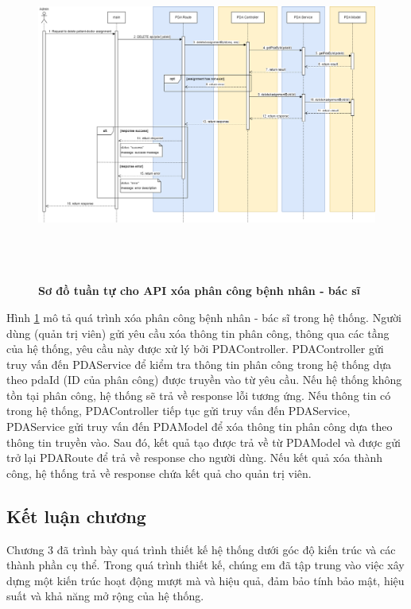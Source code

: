\begin{figure}[H]
  \centering
  \includegraphics[width=16cm,height=11cm]{Images/sequence_api/deleteAssignment.png}
  \caption[Sơ đồ tuần tự cho API xóa phân công bệnh nhân - bác sĩ]{\bfseries \fontsize{12pt}{0pt}
  \selectfont Sơ đồ tuần tự cho API xóa phân công bệnh nhân - bác sĩ }
  \label{deletePDA} %
\end{figure}
Hình \ref{deletePDA} mô tả quá trình xóa phân công bệnh nhân - bác sĩ trong hệ thống. Người dùng (quản trị viên) gửi yêu cầu xóa thông tin phân công, thông qua các tầng của hệ thống, 
yêu cầu này được xử lý bởi PDAController. PDAController gửi truy vấn đến PDAService để kiểm tra thông tin phân công trong hệ thống dựa theo pdaId (ID của phân công) được truyền vào từ yêu cầu. 
Nếu hệ thống không tồn tại phân công, hệ thống sẽ trả về response lỗi tương ứng. Nếu thông tin có trong hệ thống, PDAController tiếp tục gửi truy vấn đến PDAService, PDAService gửi truy vấn đến PDAModel để xóa thông tin phân công 
dựa theo thông tin truyền vào. Sau đó, kết quả tạo được trả về từ PDAModel và được gửi trở lại PDARoute để trả về response cho người dùng. Nếu kết quả xóa thành công, hệ thống trả về response chứa kết quả cho quản trị viên. 


\subsection{Kết luận chương}

Chương 3 đã trình bày quá trình thiết kế hệ thống 
dưới góc độ kiến trúc và các thành
 phần cụ thể. Trong quá trình thiết kế, chúng em đã tập trung
  vào việc xây dựng một kiến trúc hoạt động mượt mà và hiệu quả,
   đảm bảo tính bảo mật, hiệu suất và khả năng mở rộng của hệ
    thống.

\newpage